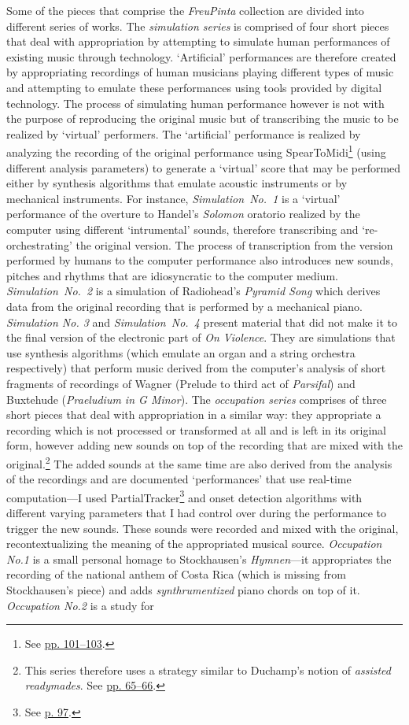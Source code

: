 Some of the pieces that comprise the \emph{FreuPinta} collection are divided into different series of works. The \emph{simulation series} is comprised of four short pieces that deal with appropriation by attempting to simulate human performances of existing music through technology. `Artificial' performances are therefore created by appropriating recordings of human musicians playing different types of music and attempting to emulate these performances using tools provided by digital technology. The process of simulating human performance however is not with the purpose of reproducing the original music but of transcribing the music to be realized by `virtual' performers. The `artificial' performance is realized by analyzing the recording of the original performance using SpearToMidi\footnote{See \hyperlink{spearmidi}{pp. 101--103}.} (using different analysis parameters) to generate a `virtual' score that may be performed either by synthesis algorithms that emulate acoustic instruments or by mechanical instruments. For instance, \mbox{\emph{Simulation No. 1}} is a `virtual' performance of the overture to Handel's \emph{Solomon} oratorio realized by the computer using different `intrumental' sounds, therefore transcribing and `re-orchestrating' the original version. The process of transcription from the version performed by humans to the computer performance also introduces new sounds, pitches and rhythms that are idiosyncratic to the computer medium. \mbox{\emph{Simulation No. 2}} is a simulation of Radiohead's \emph{Pyramid Song} which derives data from the original recording that is performed by a mechanical piano. \emph{Simulation No. 3} and \mbox{\emph{Simulation No. 4}} present material that did not make it to the final version of the electronic part of \emph{On Violence}. They are simulations that use synthesis algorithms (which emulate an organ and a string orchestra respectively) that perform music derived from the computer's analysis of short fragments of recordings of Wagner (Prelude to third act of \emph{Parsifal}) and Buxtehude (\emph{Praeludium in G Minor}). The \emph{occupation series} comprises of three short pieces that deal with appropriation in a similar way: they appropriate a recording which is not processed or transformed at all and is left in its original form, however adding new sounds on top of the recording that are mixed with the original.\footnote{This series therefore uses a strategy similar to Duchamp's notion of \emph{assisted readymades}. See \hyperlink{lhooq}{pp. 65--66}.} The added sounds at the same time are also derived from the analysis of the recordings and are documented `performances' that use real-time computation---I used PartialTracker\footnote{See \hyperlink{partrack}{p. 97}.} and onset detection algorithms with different varying parameters that I had control over during the performance to trigger the new sounds. These sounds were recorded and mixed with the original, recontextualizing the meaning of the appropriated musical source. \emph{Occupation No.1} is a small personal homage to Stockhausen's \emph{Hymnen}---it appropriates the recording of the national anthem of Costa Rica (which is missing from Stockhausen's piece) and adds \emph{synthrumentized} piano chords on top of it. \emph{Occupation No.2} is a study for 